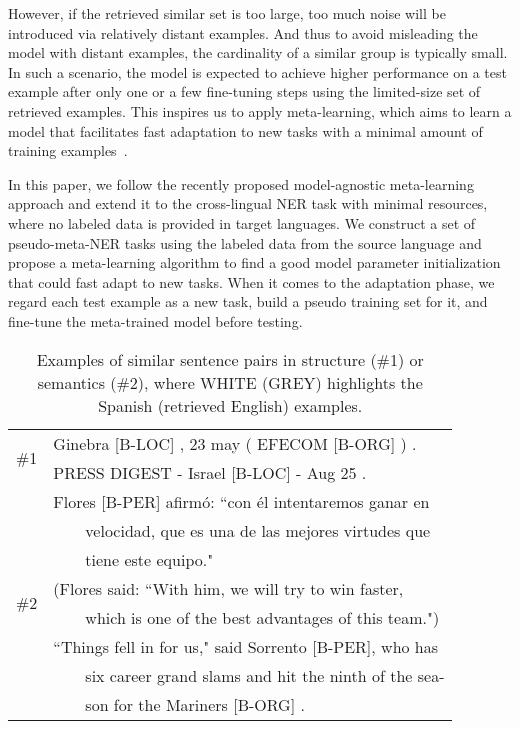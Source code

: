 \documentclass[letterpaper]{article} \usepackage{aaai20}  \usepackage{times}  \usepackage{helvet} \usepackage{courier}  \usepackage[hyphens]{url}  \usepackage{graphicx} \urlstyle{rm} \def\UrlFont{\rm}  \usepackage{graphicx}
\begin{document}
However, if the retrieved similar set is too large, too much noise will be introduced via relatively distant examples. And thus to avoid misleading the model with distant examples, the cardinality of a similar group is typically small. 
In such a scenario, the model is expected to achieve higher performance on a test example after only one or a few fine-tuning steps using the limited-size set of retrieved examples. 
This inspires us to apply meta-learning, which aims to learn a model that facilitates fast adaptation to new tasks with a minimal amount of training examples~\cite{andrychowicz2016learning,vinyals2016matching,finn2017model}.

In this paper, we follow the recently proposed model-agnostic meta-learning approach \cite{finn2017model} and extend it to the cross-lingual NER task with minimal resources, where no labeled data is provided in target languages. 
We construct a set of pseudo-meta-NER tasks using the labeled data from the source language and propose a meta-learning algorithm to find a good model parameter initialization that could fast adapt to new tasks. 
When it comes to the adaptation phase, we regard each test example as a new task, build a pseudo training set for it, and fine-tune the meta-trained model before testing.

\begin{table}[t]
    \centering
    \setlength{\tabcolsep}{1mm}
    \begin{tabular}{c|l}
        \hline
        \multirow{2}{*}{\#1} & 
        Ginebra {\scriptsize [B-LOC]} , 23 may ( EFECOM {\scriptsize [B-ORG]} ) . \\
        &\cellcolor{gray!25}PRESS DIGEST - Israel {\scriptsize [B-LOC]} - Aug 25 .  \\
        \hline
\multirow{8}{*}{\#2} & 
        Flores {\scriptsize [B-PER]} afirmó: ``con él intentaremos ganar en\\
        &~~~~velocidad, que es una de las mejores virtudes que\\
        &~~~~tiene este equipo." \\
        & (Flores said: ``With him, we will try to win faster,\\
        &~~~~which is one of the best advantages of this team.")\\
        &\cellcolor{gray!25}``Things fell in for us," said Sorrento {\scriptsize [B-PER]}, who has\\
        &\cellcolor{gray!25}~~~~six career grand slams and hit the ninth of the sea-\\
        &\cellcolor{gray!25}~~~~son for the Mariners {\scriptsize [B-ORG]} .\\
\hline
    \end{tabular}
    
    \caption{Examples of similar sentence pairs in structure (\#1) or semantics (\#2), where WHITE (\colorbox{gray!25}{GREY}) highlights the Spanish (retrieved English) examples. }
    
    \label{tab:eg_retrieve}
\end{table}
\end{document}

